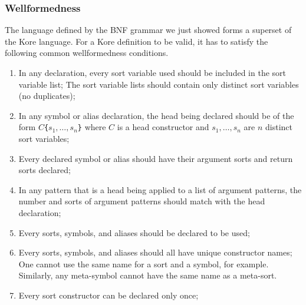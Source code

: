 \documentclass[UTF8,11pt]{article}
\theoremstyle{plain}
\theoremstyle{definition}
\theoremstyle{remark}
\newcommand{\parametric}[2]{{#1}\raisebox{.2ex}{\texttt{\footnotesize{\{}}}#2\raisebox{.2ex}{\texttt{\footnotesize{\}}}}}
\begin{document}
%
%
%
%
%
%

\subsubsection{Wellformedness}
\label{sec:kore-syntax-wellformedness}
The language defined by the BNF grammar we just showed forms a superset of the 
Kore language.
For a Kore definition to be valid, it has to satisfy the following common 
wellformedness conditions.
\begin{enumerate}\itemsep0em
\item In any declaration, every sort variable used should be included in the
sort variable list; The sort variable lists should contain only distinct sort 
variables (no duplicates);
\item In any symbol or alias declaration, the head being declared should be of 
the form \texttt{$C$\{$s_1,\dots,s_n$\}} where $C$ is a head constructor and 
$s_1,\dots,s_n$ are $n$ distinct sort variables;
\item Every declared symbol or alias should have their argument sorts and 
return sorts declared;
\item In any pattern that is a head being applied to a list of argument 
patterns, the number and sorts of argument patterns should match with the head 
declaration;
\item Every sorts, symbols, and aliases should be declared to be used;
\item Every sorts, symbols, and aliases should all have unique constructor 
names; One cannot use the same name for a sort and a symbol, for example. 
Similarly, any meta-symbol cannot have the same name as a meta-sort.
\item Every sort constructor can be declared only once;
\end{enumerate}
\end{document}
